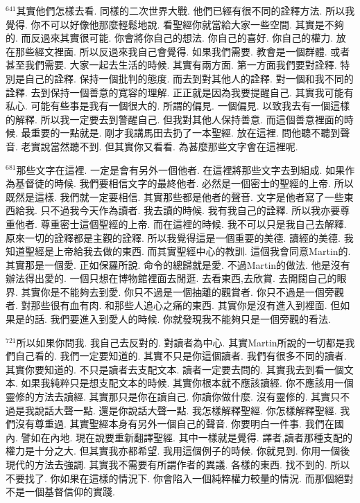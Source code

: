 \documentclass{book}
\begin{document}
$^{641}$其實他們怎樣去看.
同樣的二次世界大戰.
他們已經有很不同的詮釋方法.
所以我覺得.
你不可以好像他那麼輕鬆地說.
看聖經你就當給大家一些空間.
其實是不夠的.
而反過來其實很可能.
你會將你自己的想法.
你自己的喜好.
你自己的權力.
放在那些經文裡面.
所以反過來我自己會覺得.
如果我們需要.
教會是一個群體.
或者甚至我們需要.
大家一起去生活的時候.
其實有兩方面.
第一方面我們要對詮釋.
特別是自己的詮釋.
保持一個批判的態度.
而去到對其他人的詮釋.
對一個和我不同的詮釋.
去到保持一個善意的寬容的理解.
正正就是因為我要提醒自己.
其實我可能有私心.
可能有些事是我有一個很大的.
所謂的偏見.
一個偏見.
以致我去有一個這樣的解釋.
所以我一定要去到警醒自己.
但我對其他人保持善意.
而這個善意裡面的時候.
最重要的一點就是.
剛才我講馬田去扔了一本聖經.
放在這裡.
問他聽不聽到聲音.
老實說當然聽不到.
但其實你又看看.
為甚麼那些文字會在這裡呢.

$^{681}$那些文字在這裡.
一定是會有另外一個他者.
在這裡將那些文字去到組成.
如果作為基督徒的時候.
我們要相信文字的最終他者.
必然是一個密士的聖經的上帝.
所以既然是這樣.
我們就一定要相信.
其實那些都是他者的聲音.
文字是他者寫了一些東西給我.
只不過我今天作為讀者.
我去讀的時候.
我有我自己的詮釋.
所以我亦要尊重他者.
尊重密士這個聖經的上帝.
而在這裡的時候.
我不可以只是我自己去解釋.
原來一切的詮釋都是主觀的詮釋.
所以我覺得這是一個重要的美德.
讀經的美德.
我知道聖經是上帝給我去做的東西.
而其實聖經中心的教訓.
這個我會同意Martin的.
其實那是一個愛.
正如保羅所說.
命令的總歸就是愛.
不過Martin的做法.
他是沒有辦法得出愛的.
一個只想在博物館裡面去閒逛.
去看東西,去欣賞.
去開闊自己的眼界.
其實你是不能夠去到愛.
你只不過是一個抽離的觀賞者.
你只不過是一個旁觀者.
對那些很有血有肉.
和那些人追心之痛的東西.
其實你是沒有進入到裡面.
但如果是的話.
我們要進入到愛人的時候.
你就發現我不能夠只是一個旁觀的看法.

$^{721}$所以如果你問我.
我自己去反對的.
對讀者為中心.
其實Martin所說的一切都是我們自己看的.
我們一定要知道的.
其實不只是你這個讀者.
我們有很多不同的讀者.
其實你要知道的.
不只是讀者去支配文本.
讀者一定要去問的.
其實我去到看一個文本.
如果我純粹只是想支配文本的時候.
其實你根本就不應該讀經.
你不應該用一個靈修的方法去讀經.
其實那只是你在讀自己.
你讀你做什麼.
沒有靈修的.
其實只不過是我說話大聲一點.
還是你說話大聲一點.
我怎樣解釋聖經.
你怎樣解釋聖經.
我們沒有尊重過.
其實聖經本身有另外一個自己的聲音.
你要明白一件事.
我們在國內.
譬如在內地.
現在說要重新翻譯聖經.
其中一樣就是覺得.
譯者,讀者那種支配的權力是十分之大.
但其實我亦都希望.
我用這個例子的時候.
你就見到.
你用一個後現代的方法去強調.
其實我不需要有所謂作者的異議.
各樣的東西.
找不到的.
所以不要找了.
你如果在這樣的情況下.
你會陷入一個純粹權力較量的情況.
而那個絕對不是一個基督信仰的實踐.
\end{document}
